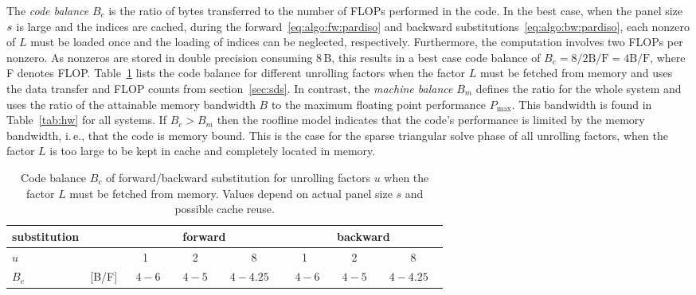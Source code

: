 The \textit{code balance} $B_c$ is the ratio of bytes transferred to the
number of FLOPs performed in the code.
In the best case, when the panel size $s$ is large and the indices are
cached, during the forward~\eqref{eq:algo:fw:pardiso} and backward
substitutions~\eqref{eq:algo:bw:pardiso}, each nonzero of $L$ must be loaded once
and the loading of indices can be neglected,
respectively. 
Furthermore, the computation involves two FLOPs per nonzero.
As nonzeros are stored in double precision consuming $8$\,B, this results in a
best case code balance of $B_c = 8 / 2 \text{B/F} = 4 \text{B/F}$, where F
denotes FLOP.
Table~\ref{tab:mrm:bc} lists the code balance for different unrolling factors
when the factor $L$ must be fetched from memory and uses the data transfer and
FLOP counts from section~\ref{sec:sds}.
In contrast, the \textit{machine balance} $B_m$ defines the ratio for the whole system
and uses the ratio of the attainable memory bandwidth $B$ to the maximum floating point
performance $P_\text{max}$.
This bandwidth is found in Table~\ref{tab:hw} for all systems.
%
If $B_c > B_m$ then the roofline model indicates 
that the code's performance is
limited by the memory bandwidth,
i.\,e., that the code is memory bound.
{This is the case for the sparse %
triangular solve 
phase %
of all
unrolling factors,
when the factor $L$ is too large to be kept in cache and
completely located in memory.}

\begin{table}[t]
  \centering
   \begin{tabular}{ll|cm{}cm{}c|cm{}cm{}c}
  \hline
  substitution && \multicolumn{5}{c|}{forward} & \multicolumn{5}{c}{backward} \\
  \hline
     $u$    &     &  1   &  & 2    &  & 8        & 1     &  & 2   &  & 8  \\
     $B_c$  & [B/F]\, & \ $4-6$ & & $4-5$ & & $4-4.25$ \ & \ $4-6$ & & $4-5$ & & $4-4.25$ \ \\
  \hline
  \end{tabular}
  \caption{Code balance $B_c$ of forward/backward substitution for
unrolling factors $u$ when
the factor $L$ must be fetched from memory.
Values depend on actual panel size $s$ and possible cache reuse.}
  \label{tab:mrm:bc}
\end{table}

